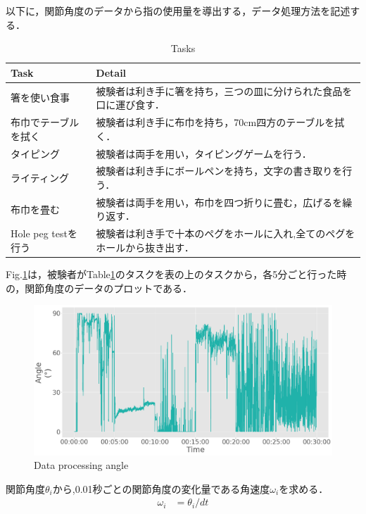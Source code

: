 以下に，関節角度のデータから指の使用量を導出する，データ処理方法を記述する．
\begin{table}[H]
  \caption{Tasks}
  \label{table:tasks}
  \centering
  \begin{tabular}{ll}
    \hline
    Task &  Detail  \\
    \hline \hline
箸を使い食事&
被験者は利き手に箸を持ち，三つの皿に分けられた食品を口に運び食す．\\

布巾でテーブルを拭く&
被験者は利き手に布巾を持ち，70cm四方のテーブルを拭く．\\

タイピング&
被験者は両手を用い，タイピングゲームを行う．\\

ライティング&
被験者は利き手にボールペンを持ち，文字の書き取りを行う．\\

布巾を畳む&
被験者は両手を用い，布巾を四つ折りに畳む，広げるを繰り返す．\\

Hole peg testを行う&
被験者は利き手で十本のペグをホールに入れ,全てのペグをホールから抜き出す．\\

    \hline
  \end{tabular}
\end{table}


Fig.\ref{fig:angle}は，被験者がTable\ref{table:tasks}のタスクを表の上のタスクから，各5分ごと行った時の，関節角度のデータのプロットである．

\begin{figure}[H]
  \centering
  \includegraphics[width=0.8\linewidth]{fig/angle_}
  \caption{Data processing angle}
  \label{fig:angle}
\end{figure}

関節角度$\theta_i$から,0.01秒ごとの関節角度の変化量である角速度$\omega_i$を求める．
\begin{eqnarray}
\omega_i & = \theta_i /dt
\end{eqnarray}

